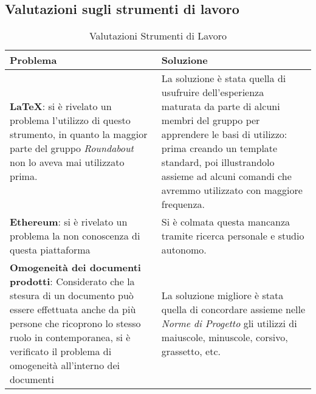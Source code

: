 \subsection{Valutazioni sugli strumenti di lavoro}
	\begin{longtable}{ 
			>{\centering}p{} 
			>{\centering\arraybackslash}p{} }
		
		\caption {Valutazioni Strumenti di Lavoro}		\\
		
		\textbf{\color{white}Problema} &
		\textbf{\color{white}Soluzione}
		\tabularnewline  
		\endhead
		
		\textbf{\LaTeX{}}: si è rivelato un problema l'utilizzo di questo strumento, in quanto la maggior parte del gruppo \textit{Roundabout} non lo aveva mai utilizzato prima. & La soluzione è stata quella di usufruire dell'esperienza maturata da parte di alcuni membri del gruppo per apprendere le basi di utilizzo: prima creando un template standard, poi illustrandolo assieme ad alcuni comandi che avremmo utilizzato con maggiore frequenza. \\
		
		\textbf{Ethereum\ped{\textit{G}}}: si è rivelato un problema la non conoscenza di questa piattaforma & Si è colmata questa mancanza tramite ricerca personale e studio autonomo. \\
		
		\textbf{Omogeneità dei documenti prodotti}: Considerato che la stesura di un documento può essere effettuata anche da più persone che ricoprono lo stesso ruolo in contemporanea, si è verificato il problema di omogeneità all'interno dei documenti & La soluzione migliore è stata quella di concordare assieme nelle \textit{Norme di Progetto} gli utilizzi di maiuscole, minuscole, corsivo, grassetto, etc. \\
		
	\end{longtable}
